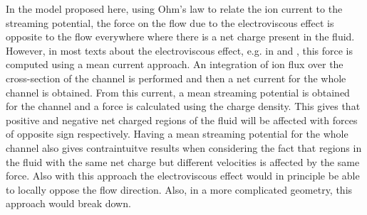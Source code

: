 In the model proposed here, using Ohm's law to relate the ion current
to the streaming potential, the force on the flow due to the
electroviscous effect is opposite to the flow everywhere where there
is a net charge present in the fluid. However, in most texts about the
electroviscous effect, e.g. in \cite{dongquing-ren-book} and
\cite{ren-elvis-paper}, this force is computed using a mean current
approach. An integration of ion flux over the cross-section of the
channel is performed and then a net current for the whole channel is
obtained. From this current, a mean streaming potential is obtained
for the channel and a force is calculated using the charge
density. This gives that positive and negative net charged regions of
the fluid will be affected with forces of opposite sign
respectively. Having a mean streaming potential for the whole channel
also gives contraintuitve results when considering the fact that
regions in the fluid with the same net charge but different velocities
is affected by the same force. Also with this approach the
electroviscous effect would in principle be able to locally oppose the
flow direction. Also, in a more complicated geometry, this approach
would break down. 
